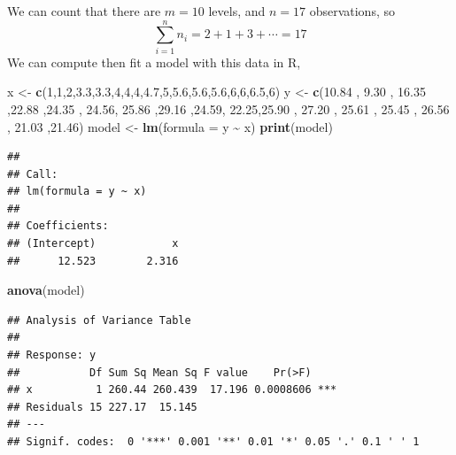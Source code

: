 \documentclass[
  11pt,
]{article}
\newenvironment{Shaded}{\begin{snugshade}}{\end{snugshade}}
\newcommand{\AttributeTok}[1]{\textcolor[rgb]{0.13,0.29,0.53}{#1}}
\newcommand{\DecValTok}[1]{\textcolor[rgb]{0.00,0.00,0.81}{#1}}
\newcommand{\FloatTok}[1]{\textcolor[rgb]{0.00,0.00,0.81}{#1}}
\newcommand{\FunctionTok}[1]{\textcolor[rgb]{0.13,0.29,0.53}{\textbf{#1}}}
\newcommand{\NormalTok}[1]{#1}
\newcommand{\OtherTok}[1]{\textcolor[rgb]{0.56,0.35,0.01}{#1}}
\newcommand{\SpecialCharTok}[1]{\textcolor[rgb]{0.81,0.36,0.00}{\textbf{#1}}}
\begin{document}
We can count that there are \(m= 10\) levels, and \(n=17\) observations,
so \[\sum_{i=1}^n n_i = 2 + 1 + 3 + \cdots = 17\] We can compute then
fit a model with this data in R,

\begin{Shaded}
\begin{Highlighting}[]
\NormalTok{x }\OtherTok{\textless{}{-}} \FunctionTok{c}\NormalTok{(}\DecValTok{1}\NormalTok{,}\DecValTok{1}\NormalTok{,}\DecValTok{2}\NormalTok{,}\FloatTok{3.3}\NormalTok{,}\FloatTok{3.3}\NormalTok{,}\DecValTok{4}\NormalTok{,}\DecValTok{4}\NormalTok{,}\DecValTok{4}\NormalTok{,}\FloatTok{4.7}\NormalTok{,}\DecValTok{5}\NormalTok{,}\FloatTok{5.6}\NormalTok{,}\FloatTok{5.6}\NormalTok{,}\FloatTok{5.6}\NormalTok{,}\DecValTok{6}\NormalTok{,}\DecValTok{6}\NormalTok{,}\FloatTok{6.5}\NormalTok{,}\DecValTok{6}\NormalTok{)}
\NormalTok{y }\OtherTok{\textless{}{-}} \FunctionTok{c}\NormalTok{(}\FloatTok{10.84}\NormalTok{ , }\FloatTok{9.30}\NormalTok{ , }\FloatTok{16.35}\NormalTok{ ,}\FloatTok{22.88}\NormalTok{  ,}\FloatTok{24.35}\NormalTok{ , }\FloatTok{24.56}\NormalTok{, }\FloatTok{25.86}\NormalTok{ ,}\FloatTok{29.16} 
\NormalTok{      ,}\FloatTok{24.59}\NormalTok{, }\FloatTok{22.25}\NormalTok{,}\FloatTok{25.90}\NormalTok{ , }\FloatTok{27.20}\NormalTok{ , }\FloatTok{25.61}\NormalTok{ , }\FloatTok{25.45}\NormalTok{ , }\FloatTok{26.56}\NormalTok{ , }\FloatTok{21.03}\NormalTok{ ,}\FloatTok{21.46}\NormalTok{)}
\NormalTok{model }\OtherTok{\textless{}{-}} \FunctionTok{lm}\NormalTok{(}\AttributeTok{formula =}\NormalTok{ y }\SpecialCharTok{\textasciitilde{}}\NormalTok{ x)}
\FunctionTok{print}\NormalTok{(model)}
\end{Highlighting}
\end{Shaded}

\begin{verbatim}
## 
## Call:
## lm(formula = y ~ x)
## 
## Coefficients:
## (Intercept)            x  
##      12.523        2.316
\end{verbatim}

\begin{Shaded}
\begin{Highlighting}[]
\FunctionTok{anova}\NormalTok{(model)}
\end{Highlighting}
\end{Shaded}

\begin{verbatim}
## Analysis of Variance Table
## 
## Response: y
##           Df Sum Sq Mean Sq F value    Pr(>F)    
## x          1 260.44 260.439  17.196 0.0008606 ***
## Residuals 15 227.17  15.145                      
## ---
## Signif. codes:  0 '***' 0.001 '**' 0.01 '*' 0.05 '.' 0.1 ' ' 1
\end{verbatim}
\end{document}
